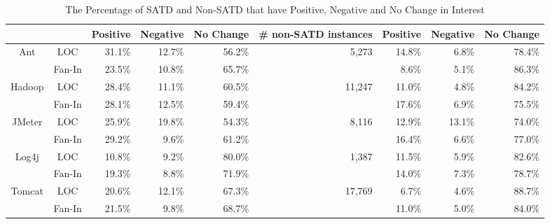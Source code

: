 \begin{table*}[tb]
  \caption{The Percentage of SATD and Non-SATD that have Positive, Negative and No Change in Interest}
  \label{tab:percentage}
  \centering

  \begin{tabular}{cc|rrr|p{0.65in}|rrr}
  \hline
        & & \textbf{Positive} & \textbf{Negative} & \textbf{No Change} & \textbf{\# non-SATD instances} & \textbf{Positive} & \textbf{Negative} & \textbf{No Change} \\
  \hline
\multirow{2}{*}{Ant} &  LOC  &  31.1\%  &  12.7\% & 56.2\% & \multicolumn{1}{r|}{\multirow{2}{*}{5,273}} &  14.8\%  &  6.8\% & 78.4\%\\
                   & Fan-In  &  23.5\%  &  10.8\% & 65.7\% &   &  8.6\%  &  5.1\% & 86.3\%\\
  \hline
\multirow{2}{*}{Hadoop} &  LOC  &  28.4\%  &  11.1\% & 60.5\% & \multicolumn{1}{r|}{\multirow{2}{*}{11,247}} &  11.0\%  &  4.8\% & 84.2\%\\
                      & Fan-In  &  28.1\%  &  12.5\% & 59.4\% &  &  17.6\%  &  6.9\% & 75.5\%\\
  \hline
\multirow{2}{*}{JMeter} &  LOC  &  25.9\%  &  19.8\% & 54.3\% & \multicolumn{1}{r|}{\multirow{2}{*}{8,116}} &  12.9\%  &  13.1\% & 74.0\%\\
                      & Fan-In  &  29.2\%  &  9.6\% & 61.2\% &  &  16.4\%  &  6.6\% & 77.0\%\\
  \hline
\multirow{2}{*}{Log4j} &  LOC  &  10.8\%  &  9.2\% & 80.0\% & \multicolumn{1}{r|}{\multirow{2}{*}{1,387}} &  11.5\%  &  5.9\% & 82.6\%\\
                     & Fan-In  &  19.3\%  &  8.8\% & 71.9\% &  &  14.0\%  &  7.3\% & 78.7\%\\
  \hline
\multirow{2}{*}{Tomcat} &  LOC &  20.6\%  &  12.1\% & 67.3\% & \multicolumn{1}{r|}{\multirow{2}{*}{17,769}} &  6.7\%  &  4.6\% & 88.7\%\\
                      & Fan-In &  21.5\%  &  9.8\% & 68.7\% &  &  11.0\%  &  5.0\% & 84.0\%\\
  \hline
  \end{tabular}
\end{table*}
